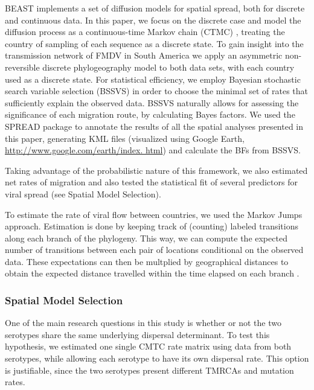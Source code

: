 \documentclass[10pt]{article}
\begin{document}
BEAST \cite{BEAST} implements a set of diffusion models for spatial spread, both for discrete and continuous data.
In this paper, we focus on the discrete case and model the diffusion process as a continuous-time Markov chain (CTMC) \cite{roots}, treating the country of sampling of each sequence as a discrete state.
To gain insight into the transmission network of FMDV in South America we apply an asymmetric non-reversible discrete phylogeography model to both data sets, with each country used as a discrete state.
For statistical efficiency, we employ Bayesian stochastic search variable selection (BSSVS) in order to choose the minimal set of rates that sufficiently explain the observed data.
BSSVS naturally allows for assessing the significance of each migration route, by calculating Bayes factors.
We used the SPREAD \cite{spread} package to annotate the results of all the spatial analyses presented in this paper, generating KML files (visualized using Google Earth, \url{http://www.google.com/earth/index.
html}) and calculate the BFs from BSSVS.

Taking advantage of the probabilistic nature of this framework, we also estimated net rates of migration and also tested the statistical fit of several predictors for viral spread (see Spatial Model Selection).

To estimate the rate of viral flow between countries, we used the Markov Jumps \cite{Minin2008} approach.
Estimation is done by keeping track of (counting) labeled transitions along each branch of the phylogeny.
This way, we can compute the expected number of transitions between each pair of locations conditional on the observed data.
These expectations can then be multplied by geographical distances to obtain the expected distance travelled within the time elapsed on each branch \cite{zoonotic}.


\subsubsection*{Spatial Model Selection}

One of the main research questions in this study is whether or not the two serotypes share the same underlying dispersal determinant. 
To test this hypothesis, we estimated one single CMTC rate matrix using data from both serotypes, while allowing each serotype to have its own dispersal rate. 
This option is justifiable, since the two serotypes present different TMRCAs and mutation rates. 
\end{document}
